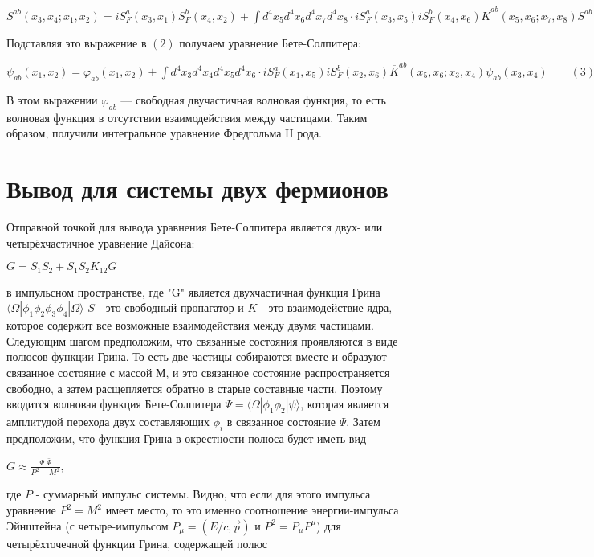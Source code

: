 \documentclass[a4paper,14pt,russian]{article}
\begin{document}
$ S^{ab}(x_{3},x_{4};x_{1},x_{2})=iS_{F}^{a}(x_{3},x_{1})S_{F}^{b}(x_{4},x_{2})+\int{d^{4}x_{5}d^{4}x_{6}d^{4}x_{7}d^{4}x_{8}\cdot iS^{a}_{F}(x_{3},x_{5})iS^{b}_{F}(x_{4},x_{6})\overline{K}^{ab}(x_{5},x_{6};x_{7},x_{8})S^{ab}(x_{7},x_{8};x_{1},x_{2})} $

Подставляя это выражение в $ ( 2 ) $ получаем уравнение Бете-Солпитера:

$ \psi_{ab}(x_{1},x_{2})=\varphi_{ab}(x_{1},x_{2})+\int{d^{4}x_{3}d^{4}x_{4}d^{4} x_{5} d^{4}x_{6}\cdot iS^{a}_{F}(x_{1},x_{5})iS^{b}_{F}(x_{2},x_{6})\overline{K}^{ab}(x_{5},x_{6};x_{3},x_{4})\psi_{ab}(x_{3},x_{4})}\qquad ( 3 ) $

В этом выражении $ \varphi_{ab} $ — свободная двучастичная волновая функция, то есть волновая функция в отсутствии взаимодействия между частицами. Таким образом, получили интегральное уравнение Фредгольма II рода.

\section{Вывод для системы двух фермионов} 

Отправной точкой для вывода уравнения Бете-Солпитера является двух- или четырёхчастичное уравнение Дайсона:

$ G = S_1 S_2 + S_1 S_2  K_{12}  G  $

в импульсном пространстве, где "G" является двухчастичная функция Грина $ \langle\Omega| \phi_1  \phi_2  \phi_3   \phi_4 |\Omega\rangle $ $S$ - это свободный пропагатор и $K$ - это взаимодействие ядра, которое содержит все возможные взаимодействия между двумя частицами. Следующим шагом предположим, что связанные состояния проявляются в виде полюсов функции Грина. То есть две частицы собираются вместе и образуют связанное состояние с массой $М$, и это связанное состояние распространяется свободно, а затем расщепляется обратно в старые составные части. Поэтому вводится волновая функция Бете-Солпитера $ \Psi =  \langle\Omega| \phi_1  \phi_2|\psi\rangle $, которая является амплитудой перехода двух составляющих $ \phi_i $ в связанное состояние $ \Psi $. Затем предположим, что функция Грина в окрестности полюса будет иметь вид

$  G \approx \frac{\Psi\;\bar\Psi}{P^2-M^2},$

где $P$ - суммарный импульс системы. Видно, что если для этого импульса уравнение $ P ^ 2 = M ^ 2 $ имеет место, то это именно соотношение энергии-импульса Эйнштейна (с четыре-импульсом $ P_\mu = \left(E/c,\vec p  \right) $ и $ P^2 = P_\mu P^\mu $) для четырёхточечной функции Грина, содержащей полюс
\end{document}
